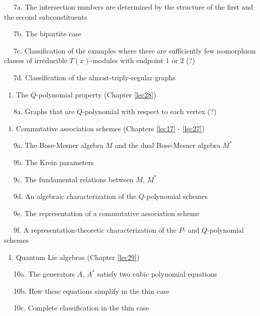 \documentclass[
]{book}
\providecommand{\tightlist}{%
  \setlength{\itemsep}{0pt}\setlength{\parskip}{0pt}}
\theoremstyle{definition}
\theoremstyle{definition}
\theoremstyle{definition}
\theoremstyle{definition}
\theoremstyle{remark}
\begin{document}
\(\quad\) 7a. The intersection numbers are determined by the structure of the first and the second subconstituents

\(\quad\) 7b. The bipartite case

\(\quad\) 7c. Classification of the examples where there are sufficiently few isomorphism classes of irreducible \(T(x)\)-modules with endpoint \(1\) or \(2\) (?)

\(\quad\) 7d. Classification of the almost-triply-regular graphs

\begin{enumerate}
\def\labelenumi{\arabic{enumi}.}
\setcounter{enumi}{7}
\tightlist
\item
  The \(Q\)-polynomial property (Chapter \ref{lec28})
\end{enumerate}

\(\quad\) 8a. Graphs that are \(Q\)-polynomial with respect to each vertex (?)

\begin{enumerate}
\def\labelenumi{\arabic{enumi}.}
\setcounter{enumi}{8}
\tightlist
\item
  Commutative association schemes (Chapters \ref{lec17} - \ref{lec27})
\end{enumerate}

\(\quad\) 9a. The Bose-Mesner algebra \(M\) and the dual Bose-Mesner algebra \(M^*\)

\(\quad\) 9b. The Krein parameters

\(\quad\) 9c. The fundamental relations between \(M\), \(M^*\)

\(\quad\) 9d. An algebraic characterization of the \(Q\)-polynomial schemes

\(\quad\) 9e. The representation of a commutative association scheme

\(\quad\) 9f. A representation-theoretic characterization of the \(P\)- and \(Q\)-polynomial schemes

\begin{enumerate}
\def\labelenumi{\arabic{enumi}.}
\setcounter{enumi}{9}
\tightlist
\item
  Quantum Lie algebras (Chapter \ref{lec29})
\end{enumerate}

\(\quad\) 10a. The generators \(A\), \(A^*\) satisfy two cubic polynomial equations

\(\quad\) 10b. How these equations simplify in the thin case

\(\quad\) 10c. Complete classification in the thin case
\end{document}
